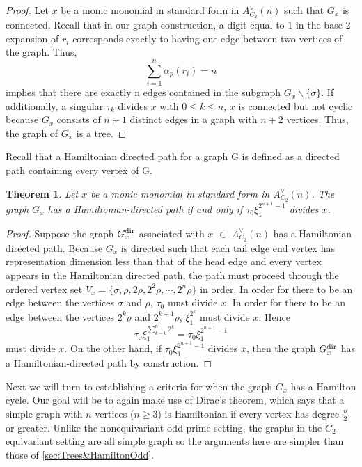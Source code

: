 \documentclass{amsart}
\newtheorem{theorem}{Theorem}[section]
\theoremstyle{definition}
\theoremstyle{plain}
\numberwithin{theorem}{section}
\numberwithin{equation}{section}
\numberwithin{figure}{section}
\newcommand{\0}{\langle 0 \rangle }
\begin{document}
\begin{proof}
Let $x$ be a monic monomial { in standard form} in $A_{C_2}^\vee(n)$ such that $G_x$ is connected. Recall that in our graph construction, a digit equal to $1$ in the base 2 expansion of $r_i$ corresponds exactly to having one edge between two vertices of the graph. Thus, \[
\sum_{i=1}^{n} \alpha_p(r_i) = n
\] implies that there are exactly n edges contained in the subgraph $G_x \backslash \{\sigma \}$. If additionally, a singular \( \tau_k \) divides $x$ with \( 0 \leq k \leq n \), $x$ is connected but not cyclic because $G_x$ consists of $n+1$ distinct edges in a graph with $n+2$ vertices. Thus, the graph of $G_x$ is a tree. 
\end{proof}

Recall that a Hamiltonian directed path for a graph G is defined as a directed path containing every vertex of G. 

\begin{theorem}
Let $x$ be a monic monomial { in standard form} in $A_{C_2}^\vee (n)$. The graph $G_x$ has a Hamiltonian-directed path if and only if $\tau_0 \xi_1^{2^{n + 1}-1}$ divides $x$.
\end{theorem}

\begin{proof} Suppose the graph $G^\textup{dir}_x$ associated with $x$ $\in$ $A_{C_2}^\vee(n)$ has a Hamiltonian directed path. Because $G_x$ is directed such that each tail edge end vertex has representation dimension less than that of the head edge and every vertex appears in the Hamiltonian directed path, the path must proceed through the ordered vertex set $V_x = \{\sigma, \rho, 2\rho, 2^2\rho, \cdots, 2^n \rho\}$ in order. In order for there to be an edge between the vertices $\sigma$ and $\rho$, $\tau_0$ must divide $x$. In order for there to be an edge between the vertices $2^{k} \rho$ and $2^{k + 1} \rho$, $\xi_1^{{2^k}}$ must divide $x$. Hence 
\[
\tau_0 \xi_1^{\sum_{k = 0}^n 2^k} = \tau_0 \xi_1^{2^{n + 1}-1}
\]
must divide $x$. On the other hand, if $\tau_0 \xi_1^{2^{n + 1}-1}$ divides $x$, then the graph $G_x^\textup{dir}$ has a Hamiltonian-directed path by construction.
\end{proof}

Next we will turn to establishing a criteria for when the graph $G_x$ has a Hamilton cycle. Our goal will be to again make use of Dirac's theorem, which says that a simple graph with $n$ vertices (${\displaystyle n\geq 3}$) is Hamiltonian if every vertex has degree ${\displaystyle {\tfrac {n}{2}}}$ or greater. Unlike the nonequivariant odd prime setting, the graphs in the $C_2$-equivariant setting are all simple graph so the arguments here are simpler than those of \cref{sec:Trees&HamiltonOdd}. 
\end{document}
